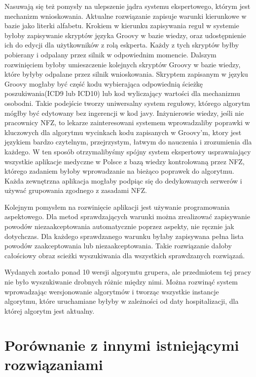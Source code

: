 Nasuwają się też pomysły na ulepszenie jądra systemu ekspertowego, którym jest mechanizm wnioskowania. Aktualne rozwiązanie zapisuje warunki kierunkowe w bazie jako literki alfabetu. Krokiem w kierunku zapisywania reguł w systemie byłoby zapisywanie skryptów języka Groovy w bazie wiedzy, oraz udostępnienie ich do edycji dla użytkowników z rolą eskperta. Każdy z tych skryptów byłby pobierany i odpalany przez silnik w odpowiednim momencie.
Dalszym rozwinięciem byłoby umieszczenie kolejnych skryptów Groovy w bazie wiedzy, które byłyby odpalane przez silnik wnioskowania. Skryptem zapisanym w języku Groovy mogłaby być część kodu wybierająca odpowiednią ścieżkę poszukiwania(ICD9 lub ICD10) lub kod wyliczający wartości dla mechanizmu osobodni. Takie podejście tworzy uniwersalny system regułowy, którego algorytm mógłby być edytowany bez ingerencji w kod javy. Inżynierowie wiedzy, jeśli nie pracownicy NFZ, to lekarze zainteresowani systemem wprowadzaliby poprawki w kluczowych dla algorytmu wycinkach kodu zapisanych w Groovy'm, ktory jest językiem bardzo czytelnym, przejrzystym, łatwym do nauczenia i zrozumienia dla każdego. W ten sposób otrzymalibyśmy spójny system ekspertowy usprawniający wszystkie aplikacje medyczne w Polsce z bazą wiedzy kontrolowaną przez NFZ, którego zadaniem byłoby wprowadzanie na bieżąco poprawek do algorytmu. Każda zewnętrzna aplikacja mogłaby podpiąc się do dedykowanych serwerów i używać grupowania zgodnego z zasadami NFZ.

Kolejnym pomysłem na rozwinięcie aplikacji jest używanie programowania aspektowego. Dla metod sprawdzających warunki można zrealizować zapisywanie powodów niezaakceptowania automatycznie poprzez aspekty, nie ręcznie jak dotychczas. Dla każdego sprawdzanego warunku byłaby zapisywana pełna lista powodów zaakceptowania lub niezaakceptowania. Takie rozwiązanie dałoby całościowy obraz scieżki wyszukiwania dla wszystkich sprawdzanych rozwiązań.

Wydanych zostało ponad 10 wersji algorymtu grupera, ale przedmiotem tej pracy nie było wyszukiwanie drobnych różnic między nimi. Można rozwinąć system wprowadzając wersjonowanie algorytmów i tworząc wszystkie instancje algorytmu, które uruchamiane byłyby w zależności od daty hospitalizacji, dla której algorytm jest aktualny.


\section{Porównanie z innymi istniejącymi rozwiązaniami}
\label{sec:porownanieZinnymiRozwiazaniami}

